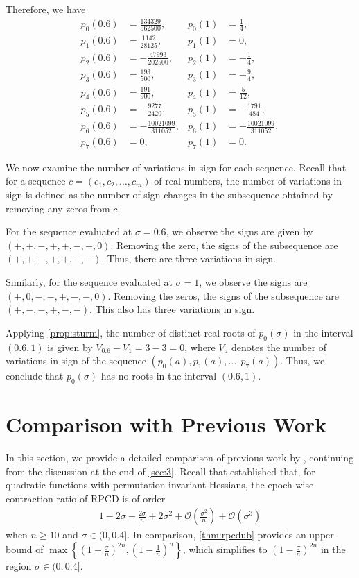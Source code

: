 \documentclass{article}
\theoremstyle{plain}
\theoremstyle{definition}
\theoremstyle{remark}
\def\bigopen#1{\left(#1\right)}
\def\gO{{\mathcal{O}}}
\begin{document}
Therefore, we have 
\begin{align*}
    p_0(0.6) &= \frac{134329}{562500}, & p_0(1) &= \frac{1}{4}, \\
    p_1(0.6) &= \frac{1142}{28125}, & p_1(1) &= 0, \\
    p_2(0.6) &= - \frac{47993}{202500}, & p_2(1) &= - \frac{1}{4}, \\
    p_3(0.6) &= \frac{193}{500}, & p_3(1) &= - \frac{9}{4}, \\
    p_4(0.6) &= \frac{191}{900}, & p_4(1) &= \frac{5}{12}, \\
    p_5(0.6) &= - \frac{9277}{2420}, & p_5(1) &= - \frac{1791}{484}, \\
    p_6(0.6) &= - \frac{10021099}{311052}, & p_6(1) &= - \frac{10021099}{311052}, \\
    p_7(0.6) &= 0, & p_7(1) &= 0.
\end{align*}

We now examine the number of variations in sign for each sequence. Recall that for a sequence $c = (c_1, c_2, \dots, c_m)$ of real numbers, the number of variations in sign is defined as the number of sign changes in the subsequence obtained by removing any zeros from $c$.

For the sequence evaluated at $\sigma = 0.6$, we observe the signs are given by $(+, +, -, +, +, -, -, 0)$. Removing the zero, the signs of the subsequence are $(+, +, -, +, +, -, -)$. Thus, there are three variations in sign.

Similarly, for the sequence evaluated at $\sigma = 1$, we observe the signs are $(+, 0, -, -, +, -, -, 0)$. Removing the zeros, the signs of the subsequence are $(+, -, -, +, -, -)$. This also has three variations in sign.

Applying \cref{prop:sturm}, the number of distinct real roots of $p_0(\sigma)$ in the interval $(0.6, 1)$ is given by $V_{0.6} - V_1 = 3 - 3 = 0$, where $V_a$ denotes the number of variations in sign of the sequence $(p_0(a), p_1(a), \dots, p_7(a))$. Thus, we conclude that $p_0(\sigma)$ has no roots in the interval $(0.6, 1)$.

\newpage
\newpage

\section{Comparison with Previous Work}
\label{sec:d}

In this section, we provide a detailed comparison of previous work by \citet{lee2019}, continuing from the discussion at the end of \cref{sec:3}.
Recall that \citet{lee2019} established that, for quadratic functions with permutation-invariant Hessians, the epoch-wise contraction ratio of RPCD is of order 
\begin{align}
    \label{eq:leerpcd}
    1 - 2 \sigma - \frac{2 \sigma}{n} + 2 \sigma^2 + \gO \bigopen{\frac{\sigma^2}{n}} + \gO \bigopen{\sigma^3}
\end{align}
when $n \ge 10$ and $\sigma \in (0, 0.4]$. In comparison, \cref{thm:rpcdub} provides an upper bound of $\max\left\{  \left( 1-\frac{\sigma}{n} \right)^{2n}, \left( 1-\frac{1}{n} \right)^n  \right\}$, which simplifies to $\left( 1-\frac{\sigma}{n} \right)^{2n}$ in the region $\sigma\in (0, 0.4]$.
\end{document}
